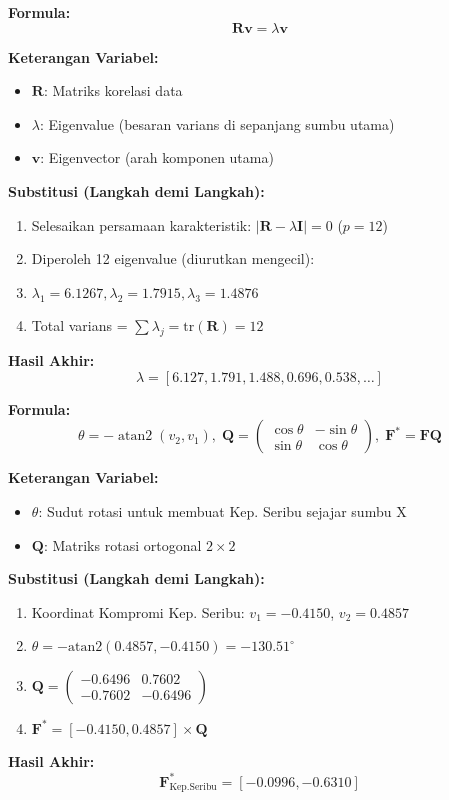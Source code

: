 \documentclass[11pt,a4paper]{article}
\begin{document}
\begin{tcolorbox}[formula_box, title={24. Dekomposisi Eigen}]
\textbf{Formula:}
\[ \mathbf{R}\mathbf{v}=\lambda\mathbf{v} \]

\textbf{Keterangan Variabel:}
\begin{itemize}
  \item $\mathbf{R}$: Matriks korelasi data
  \item $\lambda$: Eigenvalue (besaran varians di sepanjang sumbu utama)
  \item $\mathbf{v}$: Eigenvector (arah komponen utama)
\end{itemize}

\textbf{Substitusi (Langkah demi Langkah):}
\begin{enumerate}
  \item Selesaikan persamaan karakteristik: $|\mathbf{R} - \lambda\mathbf{I}| = 0$ ($p=12$)
  \item Diperoleh 12 eigenvalue (diurutkan mengecil):
  \item $\lambda_1=6.1267, \lambda_2=1.7915, \lambda_3=1.4876$
  \item Total varians = $\sum\lambda_j = \text{tr}(\mathbf{R}) = 12$
\end{enumerate}

\textbf{Hasil Akhir:}
\[ \lambda = [6.127, 1.791, 1.488, 0.696, 0.538, \ldots] \]
\end{tcolorbox}

\begin{tcolorbox}[formula_box, title={25. Rotasi Baseline}]
\textbf{Formula:}
\[ \theta=-\operatorname{atan2}(v_2,v_1),\; \mathbf{Q}=\begin{pmatrix}\cos\theta&-\sin\theta\\\sin\theta&\cos\theta\end{pmatrix},\; \mathbf{F}^*=\mathbf{F}\mathbf{Q} \]

\textbf{Keterangan Variabel:}
\begin{itemize}
  \item $\theta$: Sudut rotasi untuk membuat Kep. Seribu sejajar sumbu X
  \item $\mathbf{Q}$: Matriks rotasi ortogonal $2\times2$
\end{itemize}

\textbf{Substitusi (Langkah demi Langkah):}
\begin{enumerate}
  \item Koordinat Kompromi Kep. Seribu: $v_1=-0.4150$, $v_2=0.4857$
  \item $\theta = -\text{atan2}(0.4857, -0.4150) = -130.51^\circ$
  \item $\mathbf{Q} = \begin{pmatrix} -0.6496 & 0.7602 \\ -0.7602 & -0.6496 \end{pmatrix}$
  \item $\mathbf{F}^* = [-0.4150, 0.4857] \times \mathbf{Q}$
\end{enumerate}

\textbf{Hasil Akhir:}
\[ \mathbf{F}^*_{\text{Kep.Seribu}} = [-0.0996, -0.6310] \]
\end{tcolorbox}
\end{document}
